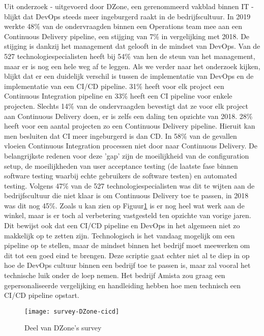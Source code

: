 Uit onderzoek - uitgevoerd door DZone, een gerenommeerd vakblad binnen IT - blijkt dat DevOps steeds meer ingeburgerd raakt in de bedrijfscultuur. In 2019 werkte 48\% van de ondervraagden binnen een Operations team mee aan een Continuous Delivery pipeline, een stijging van 7\% in vergelijking met 2018.
De stijging is dankzij het management dat gelooft in de mindset van DevOps. Van de 527 technologiespecialisten heeft bij 54\% van hen de steun van het management, maar er is nog een hele weg af te leggen.
Als we verder naar het onderzoek kijken, blijkt dat er een duidelijk verschil is tussen de implementatie van DevOps en de implementatie van een CI/CD pipeline. 
31\% heeft voor elk project een Continuous Integration pipeline en 33\% heeft een CI pipeline voor enkele projecten.
Slechts 14\% van de ondervraagden bevestigt dat ze voor elk project aan Continuous Delivery doen, er is zelfs een daling ten opzichte van 2018.
28\% heeft voor een aantal projecten zo een Continuous Delivery pipeline.
Hieruit kan men besluiten dat CI meer ingeburgerd is dan CD. In 58\% van de gevallen vloeien Continuous Integration processen niet door naar Continuous Delivery. De belangrijkste redenen voor deze 'gap' zijn de moeilijkheid van de configuration setup, de moeilijkheden van user acceptance testing (de laatste fase binnen software testing waarbij echte gebruikers de software testen) en automated testing.
Volgens 47\% van de 527 technologiespecialisten was dit te wijten aan de bedrijfscultuur die niet klaar is om Continuous Delivery toe te passen, in 2018 was dit nog 45\%.
Zoals u kan zien op Figuur\ref{img-survey-cicd} is er nog heel wat werk aan de winkel, maar is er toch al verbetering vastgesteld ten opzichte van vorige jaren. Dit bewijst ook dat een CI/CD pipeline en DevOps in het algemeen niet zo makkelijk op te zetten zijn. Technologisch is het vandaag mogelijk om een pipeline op te stellen, maar de mindset binnen het bedrijf moet meewerken om dit tot een goed eind te brengen.
Deze scriptie gaat echter niet al te diep in op hoe de DevOps cultuur binnen een bedrijf toe te passen is, maar zal vooral het technische luik onder de loep nemen. Het bedrijf Amista zou graag een gepersonaliseerde vergelijking en handleiding hebben hoe men technisch een CI/CD pipeline opstart.

\begin{figure}	
    \texttt{[image: survey-DZone-cicd]}
    \caption{Deel van DZone's survey ~\autocite{}} \label{img-survey-cicd}
\end{figure}

